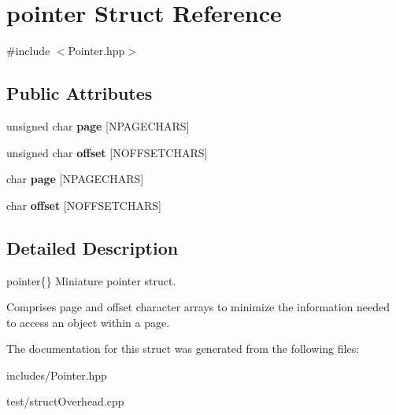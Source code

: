 \hypertarget{structpointer}{}\section{pointer Struct Reference}
\label{structpointer}


{\ttfamily \#include $<$Pointer.\+hpp$>$}

\subsection*{Public Attributes}
\begin{DoxyCompactItemize}
\item 
\mbox{\label{structpointer_ab87c49e9530aac6ca6e774e4f9e4ee79}} 
unsigned char {\bfseries page} \mbox{[}N\+P\+A\+G\+E\+C\+H\+A\+RS\mbox{]}
\item 
\mbox{\label{structpointer_a10d309201f42a88b3ea6ae824cf29c06}} 
unsigned char {\bfseries offset} \mbox{[}N\+O\+F\+F\+S\+E\+T\+C\+H\+A\+RS\mbox{]}
\item 
\mbox{\label{structpointer_a6b99504e0c08397e28c749f87ae69984}} 
char {\bfseries page} \mbox{[}N\+P\+A\+G\+E\+C\+H\+A\+RS\mbox{]}
\item 
\mbox{\label{structpointer_acb55bc4d12e4f0ae766eeda780abc7d6}} 
char {\bfseries offset} \mbox{[}N\+O\+F\+F\+S\+E\+T\+C\+H\+A\+RS\mbox{]}
\end{DoxyCompactItemize}


\subsection{Detailed Description}
pointer\{\} Miniature pointer struct.

Comprises page and offset character arrays to minimize the information needed to access an object within a page. 

The documentation for this struct was generated from the following files\+:\begin{DoxyCompactItemize}
\item 
includes/Pointer.\+hpp\item 
test/struct\+Overhead.\+cpp\end{DoxyCompactItemize}
